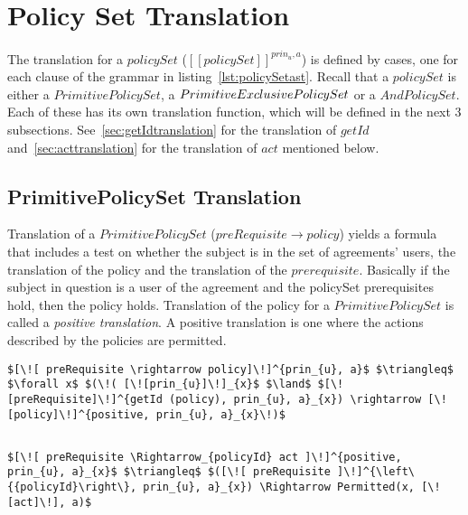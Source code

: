 \section{Policy Set Translation}
The translation for a $policySet$ ($[\![policySet]\!]^{prin_{u}, a}$) is defined by cases, one for each clause of the grammar in listing~\ref{lst:policySetast}. Recall that a $policySet$ is either a $PrimitivePolicySet$, a $\linebreak PrimitiveExclusivePolicySet$ or a $AndPolicySet$. Each of these has its own translation function, which will be defined in the next 3 subsections. See~\ref{sec:getIdtranslation} for the translation of $getId$ and~\ref{sec:acttranslation} for the translation of $act$ mentioned below.


\subsection{PrimitivePolicySet Translation}
Translation of a $PrimitivePolicySet$ ($preRequisite \rightarrow policy$) yields a formula that includes a test on whether the subject is in the set of agreements' users, the translation of the policy and the translation of the $prerequisite$. Basically if the subject in question is a user of the agreement and the policySet prerequisites hold, then the policy holds. Translation of the policy for a $PrimitivePolicySet$ is called a \emph{positive translation}. A positive translation is one where the actions described by the policies are permitted.   

\lstset{mathescape, language=AST}  
\begin{lstlisting}[frame=single, caption={Policy Set Translation {$\colon$} PrimitivePolicySet},label={lst:transpolicyformulaPrimitivePolicySet}]
$[\![ preRequisite \rightarrow policy]\!]^{prin_{u}, a}$ $\triangleq$ $\forall x$ $(\!( [\![prin_{u}]\!]_{x}$ $\land$ $[\![preRequisite]\!]^{getId (policy), prin_{u}, a}_{x}) \rightarrow [\![policy]\!]^{positive, prin_{u}, a}_{x}\!)$
\end{lstlisting}



\lstset{mathescape, language=AST} 
\begin{lstlisting}[frame=single, caption={Positive Policy Translation {$\colon$} Single policy},label={lst:transpolicypositiveSingle}]

$[\![ preRequisite \Rightarrow_{policyId} act ]\!]^{positive, prin_{u}, a}_{x}$ $\triangleq$ $([\![ preRequisite ]\!]^{\left\{{policyId}\right\}, prin_{u}, a}_{x}) \Rightarrow Permitted(x, [\![act]\!], a)$

\end{lstlisting}


